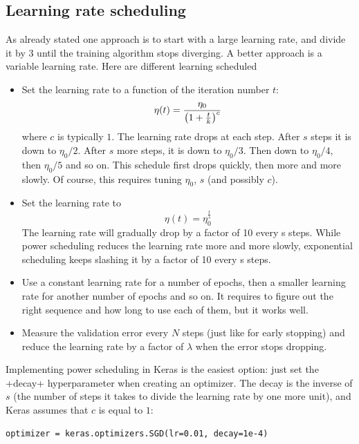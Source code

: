 \subsection{Learning rate scheduling}
As already stated one approach is to start with a large learning rate, and divide it by 3 until the training algorithm stops diverging. A better approach is a variable learning rate. Here are different learning scheduled
\begin{itemize}
\item {} Set the learning rate to a function of the iteration number $t$:
\begin{equation}
\eta(t) = \frac{\eta_0}{\left(1+\frac{t}{k}\right)^c}
\end{equation}
where $c$ is typically $1$. The learning rate drops at each step. After $s$ steps it is down to $\eta_0 / 2$. After $s$ more steps, it is down to $\eta_0 / 3$. Then down to $\eta_0 / 4$, then $\eta_0 / 5$ and so on. This schedule first drops quickly, then more and more slowly. Of course, this requires tuning $\eta_0$, $s$ (and possibly $c$).
\item {} Set the learning rate to
\begin{equation}
\eta(t) = \eta_0 ^{\frac{t}{s}}
\end{equation}
The learning rate will gradually drop by a factor of 10 every s steps. While power scheduling reduces the learning rate more and more slowly, exponential scheduling keeps slashing it by a factor of 10 every s steps.
\item {} Use a constant learning rate for a number of epochs, then a smaller learning rate for another number of epochs and so on. It requires to figure out the right sequence and how long to use each of them, but it works well.
\item {} Measure the validation error every $N$ steps (just like for early stopping) and reduce the learning rate by a factor of $\lambda$ when the error stops dropping.
\end{itemize}
Implementing power scheduling in Keras is the easiest option: just set the \cd+decay+ hyperparameter when creating an optimizer. The decay is the inverse of $s$ (the number of steps it takes to divide the learning rate by one more unit), and Keras assumes that $c$ is equal to $1$:
\begin{lstlisting}
optimizer = keras.optimizers.SGD(lr=0.01, decay=1e-4)
\end{lstlisting}
